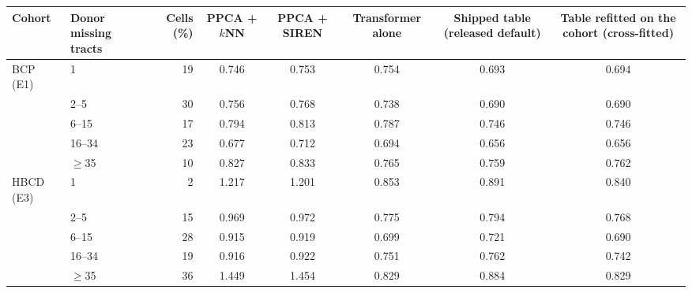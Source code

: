 \begin{tabular}{llrccccc}
\toprule
Cohort & Donor missing tracts & Cells (\%) & PPCA + $k$NN & PPCA + SIREN & Transformer alone & Shipped table (released default) & Table refitted on the cohort (cross-fitted) \\
\midrule
BCP (E1) & 1 & 19 & 0.746 & 0.753 & 0.754 & 0.693 & 0.694 \\
 & 2--5 & 30 & 0.756 & 0.768 & 0.738 & 0.690 & 0.690 \\
 & 6--15 & 17 & 0.794 & 0.813 & 0.787 & 0.746 & 0.746 \\
 & 16--34 & 23 & 0.677 & 0.712 & 0.694 & 0.656 & 0.656 \\
 & $\geq$35 & 10 & 0.827 & 0.833 & 0.765 & 0.759 & 0.762 \\
\midrule
HBCD (E3) & 1 & 2 & 1.217 & 1.201 & 0.853 & 0.891 & 0.840 \\
 & 2--5 & 15 & 0.969 & 0.972 & 0.775 & 0.794 & 0.768 \\
 & 6--15 & 28 & 0.915 & 0.919 & 0.699 & 0.721 & 0.690 \\
 & 16--34 & 19 & 0.916 & 0.922 & 0.751 & 0.762 & 0.742 \\
 & $\geq$35 & 36 & 1.449 & 1.454 & 0.829 & 0.884 & 0.829 \\
\bottomrule
\end{tabular}
